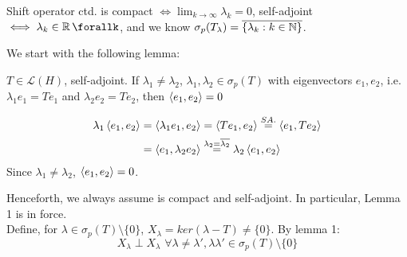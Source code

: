 \begin{example}
    Shift operator  ctd. is compact $\iff \lim_{k\to\infty}\lambda_k=0$, self-adjoint $\iff \lambda_k\in\real\,\forallk$, and we know $\sigma_p(T_\lambda)=\overline{\{\lambda_k:k\in\mathbb{N}\}}$.\\
\end{example}
We start with the following lemma:
    \begin{lemma}[Lemma 1]
        $T\in\mathcal{L}(H)$, self-adjoint. If $\lambda_1\neq\lambda_2$, $\lambda_1,\lambda_2\in\sigma_p(T)$ with eigenvectors $e_1,e_2$, i.e. $\lambda_1 e_1=Te_1$ and $\lambda_2e_2=Te_2$, then $\left<{e_1},{e_2}\right>=0$
        \begin{pf}{}{}
        \begin{equation}
            \begin{split}
                \lambda_1\left<{e_1},{e_2}\right>&=\left<{\lambda_1e_1},{e_2}\right>=\left<{Te_1},{e_2}\right>\stackrel{SA.}{=}\left<{e_1},{Te_2}\right>\\
                &=\left<{e_1},{\lambda_2e_2}\right>\stackrel{\lambda_2=\overline{\lambda_2}}{=}\lambda_2\left<{e_1},{e_2}\right>
            \end{split}
        \end{equation}
        Since $\lambda_1\neq\lambda_2$, $\left<{e_1},{e_2}\right>=0$.
            
        \end{pf}
    \end{lemma}

Henceforth, we always assume  is compact and self-adjoint. In particular, Lemma 1 is in force.\\
Define, for $\lambda\in\sigma_p(T)\setminus\{0\}$, $X_\lambda=ker(\lambda-T)\neq\{0\}$. By lemma 1:
$$X_\lambda\perp X_\lambda\,\,\forall\lambda\neq\lambda',\lambda\lambda'\in\sigma_p(T)\setminus\{0\}$$

